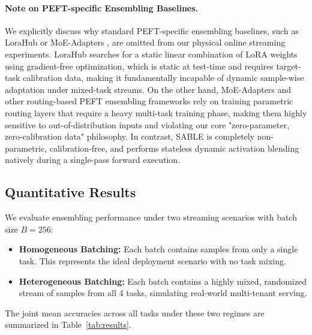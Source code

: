 \paragraph{Note on PEFT-specific Ensembling Baselines.} We explicitly discuss why standard PEFT-specific ensembling baselines, such as LoraHub \cite{huang2023lorahub} or MoE-Adapters \cite{moeadapters}, are omitted from our physical online streaming experiments. LoraHub searches for a static linear combination of LoRA weights using gradient-free optimization, which is static at test-time and requires target-task calibration data, making it fundamentally incapable of dynamic sample-wise adaptation under mixed-task streams. On the other hand, MoE-Adapters and other routing-based PEFT ensembling frameworks rely on training parametric routing layers that require a heavy multi-task training phase, making them highly sensitive to out-of-distribution inputs and violating our core "zero-parameter, zero-calibration data" philosophy. In contrast, SABLE is completely non-parametric, calibration-free, and performs stateless dynamic activation blending natively during a single-pass forward execution.

\subsection{Quantitative Results}
We evaluate ensembling performance under two streaming scenarios with batch size $B=256$:
\begin{itemize}
    \item \textbf{Homogeneous Batching:} Each batch contains samples from only a single task. This represents the ideal deployment scenario with no task mixing.
    \item \textbf{Heterogeneous Batching:} Each batch contains a highly mixed, randomized stream of samples from all 4 tasks, simulating real-world multi-tenant serving.
\end{itemize}

The joint mean accuracies across all tasks under these two regimes are summarized in Table~\ref{tab:results}.

